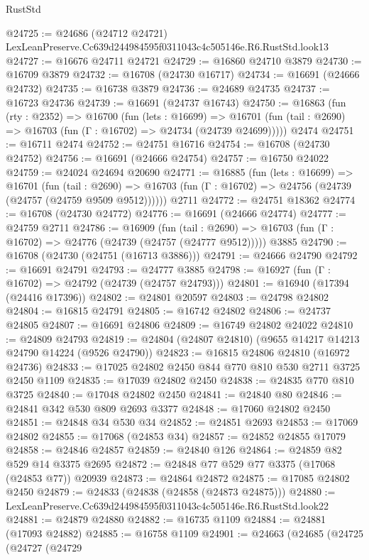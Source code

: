 \begin{lexlean}{RustStd}
\begin{coremodule}
@24725 := @24686 (@24712 @24721) LexLeanPreserve.Cc639d244984595f0311043c4c505146e.R6.RustStd.look13
@24727 := @16676 @24711 @24721
@24729 := @16860 @24710 @3879
@24730 := @16709 @3879
@24732 := @16708 (@24730 @16717)
@24734 := @16691 (@24666 @24732)
@24735 := @16738 @3879
@24736 := @24689 @24735
@24737 := @16723 @24736
@24739 := @16691 (@24737 @16743)
@24750 := @16863
    (fun (rty : @2352) =>
    @16700
      (fun (lets : @16699) =>
      @16701 (fun (tail : @2690) => @16703 (fun (Γ : @16702) => @24734 (@24739 @24699)))))
    @2474
@24751 := @16711 @2474
@24752 := @24751 @16716
@24754 := @16708 (@24730 @24752)
@24756 := @16691 (@24666 @24754)
@24757 := @16750 @24022
@24759 := @24024 @24694 @20690
@24771 := @16885
    (fun (lets : @16699) =>
    @16701
      (fun (tail : @2690) =>
      @16703 (fun (Γ : @16702) => @24756 (@24739 (@24757 (@24759 @9509 @9512))))))
    @2711
@24772 := @24751 @18362
@24774 := @16708 (@24730 @24772)
@24776 := @16691 (@24666 @24774)
@24777 := @24759 @2711
@24786 := @16909
    (fun (tail : @2690) => @16703 (fun (Γ : @16702) => @24776 (@24739 (@24757 (@24777 @9512)))))
    @3885
@24790 := @16708 (@24730 (@24751 (@16713 @3886)))
@24791 := @24666 @24790
@24792 := @16691 @24791
@24793 := @24777 @3885
@24798 := @16927 (fun (Γ : @16702) => @24792 (@24739 (@24757 @24793)))
@24801 := @16940 (@17394 (@24416 @17396))
@24802 := @24801 @20597
@24803 := @24798 @24802
@24804 := @16815 @24791
@24805 := @16742 @24802
@24806 := @24737 @24805
@24807 := @16691 @24806
@24809 := @16749 @24802 @24022
@24810 := @24809 @24793
@24819 := @24804 (@24807 @24810) (@9655 @14217 @14213 @24790 @14224 (@9526 @24790))
@24823 := @16815 @24806 @24810 (@16972 @24736)
@24833 := @17025 @24802 @2450 @844 @770 @810 @530 @2711 @3725 @2450 @1109
@24835 := @17039 @24802 @2450
@24838 := @24835 @770 @810 @3725
@24840 := @17048 @24802 @2450
@24841 := @24840 @80
@24846 := @24841 @342 @530 @809 @2693 @3377
@24848 := @17060 @24802 @2450
@24851 := @24848 @34 @530 @34
@24852 := @24851 @2693
@24853 := @17069 @24802
@24855 := @17068 (@24853 @34)
@24857 := @24852 @24855 @17079
@24858 := @24846 @24857
@24859 := @24840 @126
@24864 := @24859 @82 @529 @14 @3375 @2695
@24872 := @24848 @77 @529 @77 @3375 (@17068 (@24853 @77)) @20939
@24873 := @24864 @24872
@24875 := @17085 @24802 @2450
@24879 := @24833 (@24838 (@24858 (@24873 @24875)))
@24880 := LexLeanPreserve.Cc639d244984595f0311043c4c505146e.R6.RustStd.look22
@24881 := @24879 @24880
@24882 := @16735 @1109
@24884 := @24881 (@17093 @24882)
@24885 := @16758 @1109
@24901 := @24663
    (@24685
      (@24725
        (@24727
          (@24729

\end{coremodule}
\end{lexlean}
